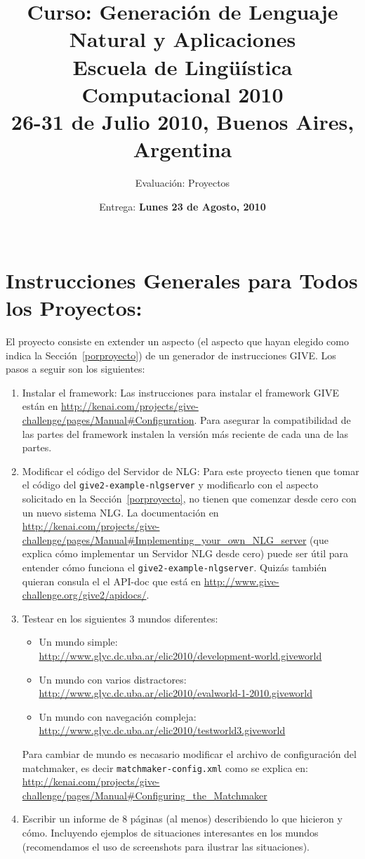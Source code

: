 \documentclass{article}
\title{\textsf{Curso: Generaci\'on de Lenguaje Natural y Aplicaciones}\\
Escuela de Ling\"u\'istica Computacional 2010 \\
26-31 de Julio 2010, Buenos Aires, Argentina\\
}
\author{Evaluaci\'on: Proyectos}
\date{Entrega: \textbf{Lunes 23 de Agosto, 2010}\\
\mbox{    } }
\begin{document}
\maketitle



\section{Instrucciones Generales para Todos los Proyectos: } 


El proyecto consiste en extender un aspecto (el aspecto que hayan elegido como indica la Secci\'on~\ref{porproyecto}) de un generador 
de instrucciones GIVE. Los pasos a seguir son los siguientes: 
   \begin{enumerate}
      \item Instalar el framework: Las instrucciones para instalar el framework GIVE est\'an en \url{http://kenai.com/projects/give-challenge/pages/Manual#Configuration}. Para asegurar la compatibilidad de las partes del framework instalen la versi\'on m\'as reciente de cada una de las partes. 
      \item Modificar el c\'odigo del Servidor de NLG: Para este proyecto tienen que tomar el c\'odigo del \texttt{give2-example-nlgserver} y modificarlo con el aspecto solicitado en la Secci\'on~\ref{porproyecto}, no tienen que comenzar desde cero con un nuevo sistema NLG. La documentaci\'on en \url{http://kenai.com/projects/give-challenge/pages/Manual#Implementing_your_own_NLG_server} (que explica c\'omo implementar un Servidor NLG desde cero) puede ser \'util para entender c\'omo funciona el \texttt{give2-example-nlgserver}. Quiz\'as tambi\'en quieran consula el el API-doc que est\'a en \url{http://www.give-challenge.org/give2/apidocs/}. 
      
       
      \item Testear en los siguientes 3 mundos diferentes:
      \begin{itemize}
      \item Un mundo simple: \\ \url{http://www.glyc.dc.uba.ar/elic2010/development-world.giveworld}
      \item Un mundo con varios distractores: \\ \url{http://www.glyc.dc.uba.ar/elic2010/evalworld-1-2010.giveworld}
      \item Un mundo con navegaci\'on compleja: \\ \url{http://www.glyc.dc.uba.ar/elic2010/testworld3.giveworld}
      \end{itemize}
      Para cambiar de mundo es necasario modificar el archivo de configuraci\'on del matchmaker, es decir \texttt{matchmaker-config.xml} como se explica en: \\ \url{http://kenai.com/projects/give-challenge/pages/Manual#Configuring_the_Matchmaker}
      
      \item Escribir un informe de 8 p\'aginas (al menos) describiendo 
      lo que hicieron y c\'omo.  Incluyendo ejemplos de situaciones interesantes 
      en los mundos (recomendamos el uso de screenshots para ilustrar las situaciones). 
   \end{enumerate}
\end{document}
